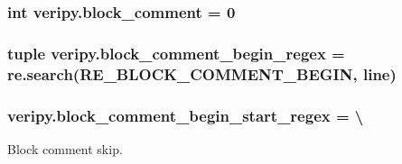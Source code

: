 \hypertarget{namespaceveripy_a62ad587d407c4f9be0fe319a908afcc9}{
\subsubsection[{block\-\_\-comment}]{\setlength{\rightskip}{0pt plus 5cm}int veripy.\-block\-\_\-comment = 0}}\label{namespaceveripy_a62ad587d407c4f9be0fe319a908afcc9}
\hypertarget{namespaceveripy_af8e07ad7fa073c970f410a7740e03386}{
\subsubsection[{block\-\_\-comment\-\_\-begin\-\_\-regex}]{\setlength{\rightskip}{0pt plus 5cm}tuple veripy.\-block\-\_\-comment\-\_\-begin\-\_\-regex = re.\-search(R\-E\-\_\-\-B\-L\-O\-C\-K\-\_\-\-C\-O\-M\-M\-E\-N\-T\-\_\-\-B\-E\-G\-I\-N, {\bf line})}}\label{namespaceveripy_af8e07ad7fa073c970f410a7740e03386}
\hypertarget{namespaceveripy_abcadaeae6f3a929e198c9d9255100a7d}{
\subsubsection[{block\-\_\-comment\-\_\-begin\-\_\-start\-\_\-regex}]{\setlength{\rightskip}{0pt plus 5cm}veripy.\-block\-\_\-comment\-\_\-begin\-\_\-start\-\_\-regex = \textbackslash{}}}\label{namespaceveripy_abcadaeae6f3a929e198c9d9255100a7d}


Block comment skip. 

